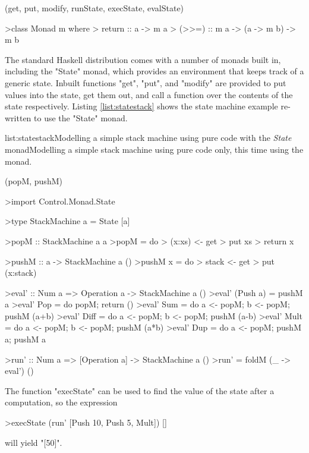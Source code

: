 \functions(get, put, modify, runState, execState, evalState)
\begin{haskell}

>class Monad m where
>  return :: a -> m a
>  (>>=) :: m a -> (a -> m b) -> m b

\end{haskell}
\noindent 
The standard Haskell distribution comes with a number of monads built in, including the "State" monad, which provides an environment that keeps track of a generic state. Inbuilt functions "get", "put", and "modify" are provided to put values into the state, get them out, and call a function over the contents of the state respectively. Listing \ref{list:statestack} shows the state machine example re-written to use the "State" monad.

\vspace{-0.5em}
\begin{listing}{list:statestack}{Modelling a simple stack machine using pure code with the \emph{State} monad}{Modelling a simple stack machine using pure code only, this time using the  monad.}{}
\end{listing}\vspace{-1.5em}

\functions(popM, pushM)
\begin{haskell}

>import Control.Monad.State

>type StackMachine a = State [a]

>popM :: StackMachine a a
>popM = do
>  (x:xs) <- get
>  put xs
>  return x

>pushM :: a -> StackMachine a ()
>pushM x = do
>  stack <- get
>  put (x:stack)

>eval' :: Num a => Operation a -> StackMachine a ()
>eval' (Push a) = pushM a
>eval' Pop  = do popM; return ()
>eval' Sum  = do a <- popM; b <- popM; pushM (a+b)
>eval' Diff = do a <- popM; b <- popM; pushM (a-b)
>eval' Mult = do a <- popM; b <- popM; pushM (a*b)
>eval' Dup  = do a <- popM; pushM a; pushM a

>run' :: Num a => [Operation a] -> StackMachine a ()
>run' = foldM (\_ -> eval') ()

\end{haskell}
\noindent The function "execState" can be used to find the value of the state after a computation, so the expression

\begin{haskell}

>execState (run' [Push 10, Push 5, Mult]) []

\end{haskell}
\noindent will yield "[50]".

